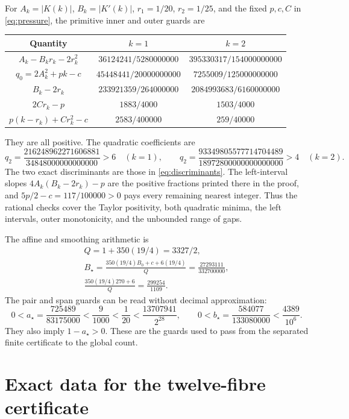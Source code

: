 \documentclass[11pt,reqno]{amsart}
\numberwithin{equation}{section}
\begin{document}
For $A_k=|K(k)|$, $B_k=|K'(k)|$, $r_1=1/20$, $r_2=1/25$,
and the fixed $p,c,C$ in \eqref{eq:pressure}, the primitive inner
and outer guards are
\begin{center}
\small
\begin{tabular}{ccc}
\toprule Quantity&$k=1$&$k=2$\\\midrule
$A_k-B_kr_k-2r_k^2$&$36124241/5280000000$&$395330317/154000000000$\\
$q_0=2A_k^2+pk-c$&$45448441/20000000000$&$7255009/125000000000$\\
$B_k-2r_k$&$233921359/264000000$&$2084993683/6160000000$\\
$2Cr_k-p$&$1883/4000$&$1503/4000$\\
$p(k-r_k)+Cr_k^2-c$&$2583/400000$&$259/40000$\\\bottomrule
\end{tabular}
\end{center}
They are all positive. The quadratic coefficients are
\[
 q_2=
 \frac{216248962271606881}{34848000000000000}>6
 \quad(k=1),\qquad
 q_2=\frac{93349805577714704489}{18972800000000000000}>4
 \quad(k=2).
\]
The two exact discriminants are those in
\eqref{eq:discriminants}. The left-interval slopes
$4A_k(B_k-2r_k)-p$ are the positive fractions printed there in
the proof, and $5p/2-c=117/100000>0$ pays every remaining nearest
integer. Thus the rational checks cover the Taylor positivity,
both quadratic minima, the left intervals, outer monotonicity, and
the unbounded range of gaps.

The affine and smoothing arithmetic is
\[
 \begin{gathered}
 Q=1+350(19/4)=3327/2,\\
 B_\star=\frac{350(19/4)B_0+c+6(19/4)}Q
 =\frac{27293111}{332700000},\\
 \frac{350(19/4)270+6}Q=\frac{299254}{1109}.
 \end{gathered}
\]
The pair and span guards can be read without decimal approximation:
\[
 0<a_\star=\frac{725489}{83175000}<\frac9{1000}<\frac1{20}
 <\frac{13707941}{2^{28}},\qquad
 0<b_\star=\frac{584077}{133080000}<\frac{4389}{10^6}.
\]
They also imply $1-a_\star>0$. These are the guards used to pass
from the separated finite certificate to the global count.

\section{Exact data for the twelve-fibre certificate}
\label{app:twelve-fibre}
\end{document}

